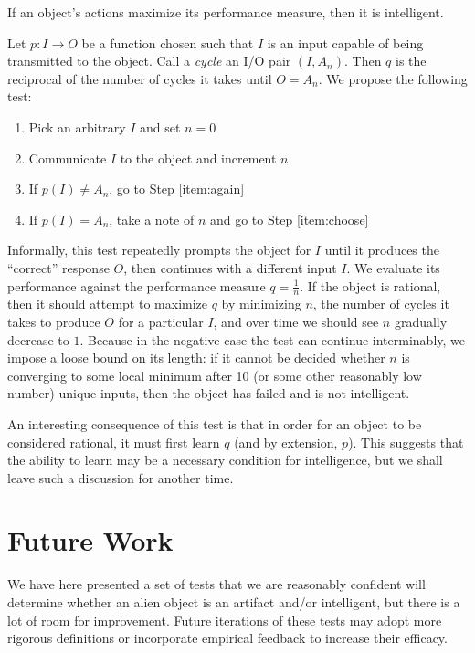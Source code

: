 \documentclass[12pt,letterpaper]{article}
\begin{document}
If an object's actions maximize its performance measure, then it is intelligent.

Let $p : I \to O$ be a function chosen such that $I$ is an input capable of being transmitted to the object. Call a \emph{cycle} an I/O pair $(I, A_n)$. Then $q$ is the reciprocal of the number of cycles it takes until $O = A_n$. We propose the following test:

\begin{enumerate}
	\singlespacing
	\item\label{item:choose} Pick an arbitrary $I$ and set $n = 0$
	\item\label{item:again} Communicate $I$ to the object and increment $n$
	\item If $p(I) \neq A_n$, go to Step \ref{item:again}
	\item If $p(I) = A_n$, take a note of $n$ and go to Step \ref{item:choose}
\end{enumerate}

Informally, this test repeatedly prompts the object for $I$ until it produces the ``correct'' response $O$, then continues with a different input $I$. We evaluate its performance against the performance measure $q = \frac{1}{n}$. If the object is rational, then it should attempt to maximize $q$ by minimizing $n$, the number of cycles it takes to produce $O$ for a particular $I$, and over time we should see $n$ gradually decrease to $1$. Because in the negative case the test can continue interminably, we impose a loose bound on its length: if it cannot be decided whether $n$ is converging to some local minimum after 10 (or some other reasonably low number) unique inputs, then the object has failed and is not intelligent.

An interesting consequence of this test is that in order for an object to be considered rational, it must first learn $q$ (and by extension, $p$). This suggests that the ability to learn may be a necessary condition for intelligence, but we shall leave such a discussion for another time.

\section*{Future Work}

We have here presented a set of tests that we are reasonably confident will determine whether an alien object is an artifact and/or intelligent, but there is a lot of room for improvement. Future iterations of these tests may adopt more rigorous definitions or incorporate empirical feedback to increase their efficacy.

\newpage

\begin{flushleft}
\begin{singlespace*}
	
	
\end{singlespace*}
\end{flushleft}
\end{document}
